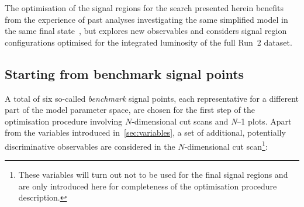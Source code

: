 The optimisation of the signal regions for the \onelepton search presented herein benefits from the experience of past analyses investigating the same simplified model in the same final state~\cite{SUSY-2013-23,SUSY-2017-01}, but explores new observables and considers signal region configurations optimised for the integrated luminosity of the full Run~2 dataset. 

\subsection{Starting from benchmark signal points}

A total of six so-called \textit{benchmark} signal points, each representative for a different part of the model parameter space, are chosen for the first step of the optimisation procedure involving $N$-dimensional cut scans and \textit{N}--1 plots.
Apart from the variables introduced in~\cref{sec:variables}, a set of additional, potentially discriminative observables are considered in the $N$-dimensional cut scan\footnote{These variables will turn out not to be used for the final signal regions and are only introduced here for completeness of the optimisation procedure description.}:
